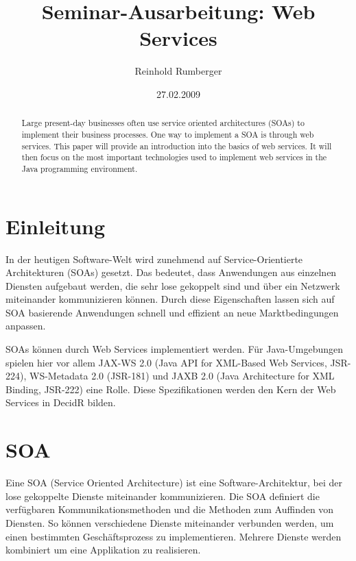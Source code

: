 \documentclass[runningheads]{llncs}
\author{Reinhold Rumberger}
\institute{Institute of Architecture of Application Systems (IAAS),\\
  University of Stuttgart\\
  \email{rumberrd@studi.informatik.uni-stuttgart.de}}
\title{Seminar-Ausarbeitung: Web Services}
\date{27.02.2009}
\newcommand{\germanquote}[1]{\glqq{}#1\grqq{}}
\newcommand{\decidr}{DecidR}
\begin{document}
  \frontmatter
  \pagestyle{headings}

  \maketitle
  \tableofcontents
  \mainmatter

  \nocite{bk_ralph}

  \label{abstract}
  \begin{otherlanguage}{english}
    \begin{abstract}
      Large present-day businesses often use service oriented architectures (SOAs) to implement
      their business processes. One way to implement a SOA is through web services. This paper will
      provide an introduction into the basics of web services. It will then focus on the most
      important technologies used to implement web services in the Java programming environment.
    \end{abstract}
  \end{otherlanguage}


  \label{intro}
  \section{Einleitung}
    In der heutigen Software-Welt wird zunehmend auf Service-Orientierte Architekturen (SOAs)
    gesetzt. Das bedeutet, dass Anwendungen aus einzelnen Diensten aufgebaut werden, die sehr lose
    gekoppelt sind und über ein Netzwerk miteinander kommunizieren können. Durch diese
    Eigenschaften lassen sich auf SOA basierende Anwendungen schnell und effizient an neue
    Marktbedingungen anpassen.

    SOAs können durch Web Services implementiert werden. Für Java-Um\-ge\-bung\-en spielen hier vor
    allem JAX-WS 2.0 (Java API for XML-Based Web Services, JSR-224), WS-Metadata 2.0 (JSR-181) und
    JAXB 2.0 (Java Architecture for XML Binding, JSR-222) eine Rolle. Diese Spezifikationen werden
    den Kern der Web Services in \decidr{} bilden.


  \label{soa}
  \section{SOA}
  \nocite{wk_soa}
    Eine \germanquote{SOA} (Service Oriented Architecture) ist eine Software-Architektur, bei der
    lose gekoppelte Dienste miteinander kommunizieren. Die SOA definiert die verfügbaren
    Kommunikationsmethoden und die Methoden zum Auffinden von Diensten. So können verschiedene
    Dienste miteinander verbunden werden, um einen bestimmten Geschäftsprozess zu implementieren.
    Mehrere Dienste werden kombiniert um eine Applikation zu realisieren.
\end{document}

